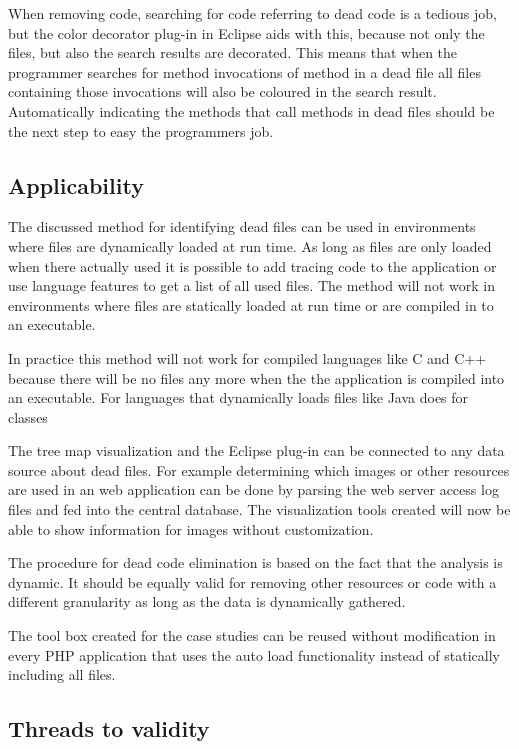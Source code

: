 When removing code, searching for code referring to dead code is a tedious job, but the color decorator plug-in in Eclipse aids with this, because not only the files, but also the search results are decorated. This means that when the programmer searches for method invocations of method in a dead file all files containing those invocations will also be coloured in the search result. Automatically indicating the methods that call methods in dead files should be the next step to easy the programmers job.

\subsection*{Applicability}

The discussed method for identifying dead files can be used in environments where files are dynamically loaded at run time. As long as files are only loaded when there actually used it is possible to add tracing code to the application or use language features to get a list of all used files. The method will not work in environments where files are statically loaded at run time or are compiled in to an executable.

In practice this method will not work for compiled languages like C and C++ because there will be no files any more when the the application is compiled into an executable. For languages that dynamically loads files like Java does for classes 

The tree map visualization and the Eclipse plug-in can be connected to any data source about dead files. For example determining which images or other resources are used in an web application can be done by parsing the web server access log files and fed into the central database. The visualization tools created will now be able to show information for images without customization.

The procedure for dead code elimination is based on the fact that the analysis is dynamic. It should be equally valid for removing other resources or code with a different granularity as long as the data is dynamically gathered.

The tool box created for the case studies can be reused without modification in every PHP application that uses the auto load functionality instead of statically including all files.

\subsection*{Threads to validity}

